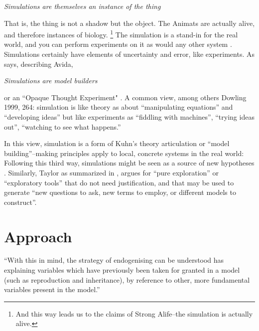 \emph{Simulations are themselves an instance of the thing}

That is, the thing is not a shadow but the object. The Animats are actually alive, and therefore instances of biology.
\footnote{And this way leads us to the claims of Strong Alife--the simulation is actually alive.}
The simulation is a stand-in for the real world, and you can perform experiments on it as would any other system \parencite[31]{Winsberg2010}. Simulations certainly have elements of uncertainty and error, like experiments. As \parencite{Adami2002} says, describing Avida, 

\emph{Simulations are model builders}

\parencite[31]{Winsberg2010} or an ``Opaque Thought Experiment" \parencite{DiPaolo2000}. A common view, among others Dowling 1999, 264: simulation is like theory as about ``manipulating equations'' and ``developing ideas'' but like experiments as ``fiddling with machines'', ``trying ideas out'', ``watching to see what happens.'' 

In this view, simulation is a form of Kuhn's theory articulation or ``model building''--making principles apply to local, concrete systems in the real world:  Following this third way, simulations might be seen as a source of new hypotheses \parencite{Eldridge}. Similarly, Taylor as summarized in \parencite{Webb2009}, argues for ``pure exploration'' or ``exploratory tools'' that do not need justification, and that may be used to generate ``new questions to ask, new terms to employ, or different models to construct''.

\section{Approach}
\begin{NOTES}

``With this in mind, the strategy of endogenising can be understood has explaining variables which have previously been taken for granted in a model (such as reproduction and inheritance), by reference to other, more fundamental variables present in the model.'' \parencite[p.129]{Bourrat2015}

\end{NOTES}
